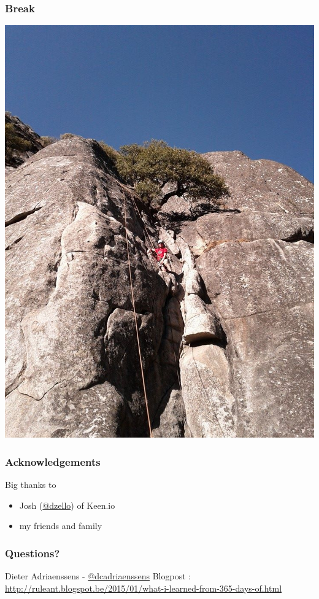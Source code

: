 \documentclass[14pt]{beamer}
\begin{document}
  \begin{frame}
    \frametitle{Break}
    \includegraphics[scale=.25]{climbing.jpg}
  \end{frame}
  \begin{frame}
    \frametitle{Acknowledgements}
    Big thanks to
    \begin{itemize}
      \item Josh (\href{https://twitter.com/dzello}{@dzello}) of Keen.io
      \item my friends and family
    \end{itemize}
  \end{frame}
  \begin{frame}
   \frametitle{Questions?}
    Dieter Adriaenssens - \href{https://twitter.com/dcadriaenssens}{\small{@dcadriaenssens}}
    \vfill
    Blogpost : \href{http://ruleant.blogspot.be/2015/01/what-i-learned-from-365-days-of.html}{http://ruleant.blogspot.be/2015/01/what-i-learned-from-365-days-of.html}
  \end{frame}
\end{document}
